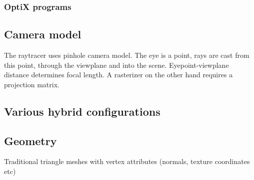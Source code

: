 \subsubsection{OptiX programs}


\subsection{Camera model}
The raytracer uses pinhole camera model. The eye is a point, rays are cast from this point, through the viewplane and into the scene. Eyepoint-viewplane distance determines focal length. A rasterizer on the other hand requires a projection matrix.

\subsection{Various hybrid configurations}

\subsection{Geometry}
Traditional triangle meshes with vertex attributes (normals, texture coordinates etc)

